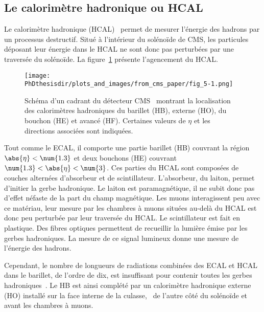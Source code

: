 \subsection{Le calorimètre hadronique ou HCAL}\label{chapter-LHC-section-CMS-subsec-HCAL}
Le calorimètre hadronique (HCAL)~\cite{cms_paper,CERN-LHCC-97-031,CMS-TDR-10} permet de mesurer l'énergie des hadrons par un processus destructif.
Situé à l'intérieur du solénoïde de CMS, les particules déposant leur énergie dans le HCAL ne sont donc pas perturbées par une traversée du solénoïde.
La figure~\ref{fig-chapter-LHC-section-CMS-subsec-HCAL-cms_paper-fig_5-1} présente l'agencement du HCAL.
\begin{figure}[h]
\centering
\texttt{[image: \\PhDthesisdir/plots\_and\_images/from\_cms\_paper/fig\_5-1.png]}
\caption[Schéma du calorimètre hadronique de CMS.]{Schéma d'un cadrant du détecteur CMS~\cite{cms_paper} montrant la localisation des calorimètres hadroniques du barillet (HB), externe (HO), du bouchon (HE) et avancé (HF). Certaines valeurs de $\eta$ et les directions associées sont indiquées.}
\label{fig-chapter-LHC-section-CMS-subsec-HCAL-cms_paper-fig_5-1}
\end{figure}
\par Tout comme le ECAL, il comporte une partie barillet (HB) couvrant la région $\abs{\eta}<\num{1.3}$ et deux bouchons (HE) couvrant $\num{1.3}<\abs{\eta}<\num{3}$.
Ces parties du HCAL sont composées de couches alternées d'absorbeur et de scintillateur.
L'absorbeur, du laiton, permet d'initier la gerbe hadronique.
Le laiton est paramagnétique, il ne subit donc pas d'effet néfaste de la part du champ magnétique.
Les muons interagissent peu avec ce matériau, leur mesure par les chambres à muons situées au-delà du HCAL est donc peu perturbée par leur traversée du HCAL.
Le scintillateur est fait en plastique.
Des fibres optiques permettent de recueillir la lumière émise par les gerbes hadroniques.
La mesure de ce signal lumineux donne une mesure de l'énergie des hadrons.
\par Cependant, le nombre de longueurs de radiations combinées des ECAL et HCAL dans le barillet, de l'ordre de dix, est insuffisant pour contenir toutes les gerbes hadroniques~\cite{cms_paper}.
Le HB est ainsi complété par un calorimètre hadronique externe (HO) installé sur la face interne de la culasse, \ie\ de l'autre côté du solénoïde et avant les chambres à muons.

